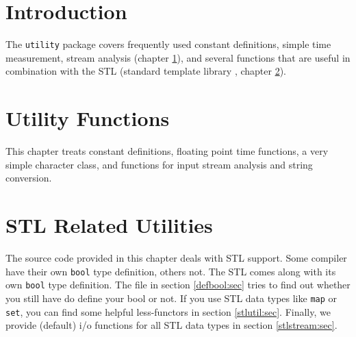 \documentclass{book}
\begin{document}
\chapter*{Introduction}

The {\tt utility} package covers frequently used constant definitions, simple
time measurement, stream analysis (chapter \ref{util:cha}), and several
functions that are useful in combination with the STL (standard template
library \cite{Josuttis:AW:1996}, chapter \ref{stl:cha}).

%
%




\chapter{Utility Functions}
\label{util:cha}

This chapter treats constant definitions, floating point time functions, a
very simple character class, and functions for input stream analysis and
string conversion.








\chapter{STL Related Utilities}
\label{stl:cha}

The source code provided in this chapter deals with STL support. Some compiler
have their own \verb+bool+ type definition, others not. The STL comes along
with its own \verb+bool+ type definition. The file in section \ref{defbool:sec}
tries to find out whether you still have do define your bool or not. If you use
STL data types like \verb+map+ or \verb+set+, you can find some helpful
less-functors in section \ref{stlutil:sec}. Finally, we provide (default) i/o
functions for all STL data types in section \ref{stlstream:sec}.






\newpage



\newpage
{}
\printindex
  
\end{document}
